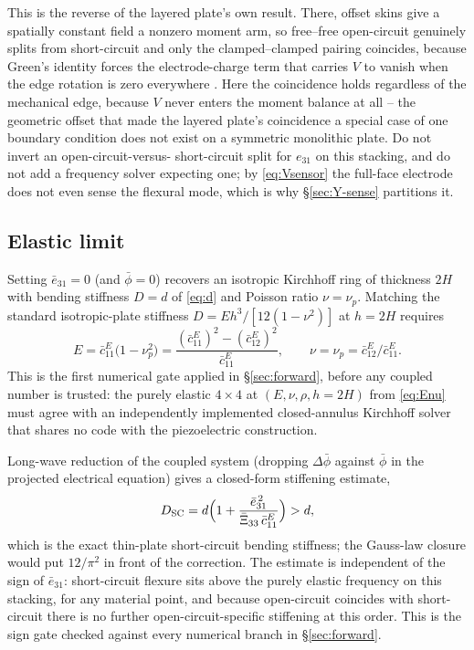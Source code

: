 \documentclass[11pt]{article}
\newcommand{\eebar}{\bar{e}_{31}}
\newcommand{\Xibar}{\bar{\Xi}_{33}}
\newcommand{\cbar}{\bar{c}_{11}^{E}}
\begin{document}
This is the reverse of the layered plate's own result. There, offset
skins give a spatially constant field a nonzero moment arm, so
free--free open-circuit genuinely splits from short-circuit and only the
clamped--clamped pairing coincides, because Green's identity forces the
electrode-charge term that carries $V$ to vanish when the edge rotation
is zero everywhere \cite{mccune2026piezo}. Here the coincidence holds
regardless of the mechanical edge, because $V$ never enters the moment
balance at all -- the geometric offset that made the layered plate's
coincidence a special case of one boundary condition does not exist on a
symmetric monolithic plate. Do not invert an open-circuit-versus-%
short-circuit split for $e_{31}$ on this stacking, and do not add a
frequency solver expecting one; by \eqref{eq:Vsensor} the full-face
electrode does not even sense the flexural mode, which is why
\S\ref{sec:Y-sense} partitions it.

\subsection{Elastic limit}\label{sec:elastic}
Setting $\eebar=0$ (and $\bar\phi=0$) recovers an isotropic Kirchhoff
ring of thickness $2H$ with bending stiffness $D=d$ of
\eqref{eq:d} and Poisson ratio $\nu=\nu_p$. Matching the standard
isotropic-plate stiffness $D=Eh^3/[12(1-\nu^2)]$ at $h=2H$ requires
\begin{equation}
E=\cbar\bigl(1-\nu_p^2\bigr)=\frac{(\cbar)^2-(\bar c_{12}^E)^2}{\cbar},
\qquad \nu=\nu_p=\bar c_{12}^E/\cbar.
\label{eq:Enu}
\end{equation}
This is the first numerical gate applied in \S\ref{sec:forward}, before
any coupled number is trusted: the purely elastic $4\times4$ at
$(E,\nu,\rho,h=2H)$ from \eqref{eq:Enu} must agree with an independently
implemented closed-annulus Kirchhoff solver \cite{mccune2026ring} that
shares no code with the piezoelectric construction.

Long-wave reduction of the coupled system (dropping $\Delta\bar\phi$
against $\bar\phi$ in the projected electrical equation) gives a
closed-form stiffening estimate,
\begin{equation}
D_{\mathrm{SC}}=d\Bigl(1+\frac{\eebar^{\,2}}
{\Xibar\,\cbar}\Bigr)>d,
\label{eq:stiffening}
\end{equation}
which is the exact thin-plate short-circuit bending stiffness; the
Gauss-law closure would put $12/\pi^2$ in front of the correction.
The estimate is
independent of the sign of $\eebar$: short-circuit flexure sits above
the purely elastic frequency on this stacking, for any material point,
and because open-circuit coincides with short-circuit there is no
further open-circuit-specific stiffening at this order. This is the sign
gate checked against every numerical branch in \S\ref{sec:forward}.
\end{document}
